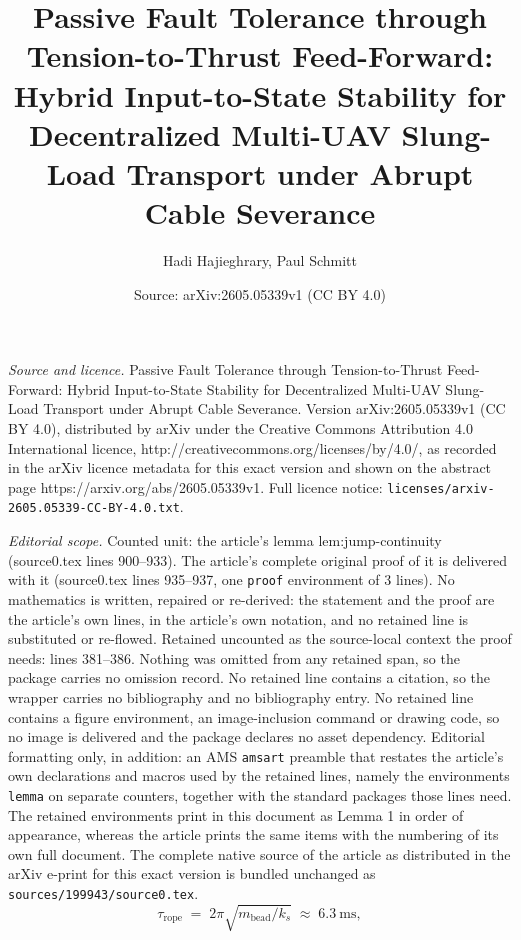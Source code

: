 \documentclass[10pt,a4paper]{amsart}
\title{Passive Fault Tolerance through Tension-to-Thrust Feed-Forward: Hybrid Input-to-State Stability for Decentralized Multi-UAV Slung-Load Transport under Abrupt Cable Severance}
\author{Hadi Hajieghrary, Paul Schmitt}
\date{Source: arXiv:2605.05339v1 (CC BY 4.0)}
\begin{document}
\maketitle

\noindent\emph{Source and licence.} Passive Fault Tolerance through Tension-to-Thrust Feed-Forward: Hybrid Input-to-State Stability for Decentralized Multi-UAV Slung-Load Transport under Abrupt Cable Severance. Version arXiv:2605.05339v1 (CC BY 4.0), distributed by arXiv under the Creative Commons Attribution 4.0 International licence, http://creativecommons.org/licenses/by/4.0/, as recorded in the arXiv licence metadata for this exact version and shown on the abstract page https://arxiv.org/abs/2605.05339v1. Full licence notice: \texttt{licenses/arxiv-2605.05339-CC-BY-4.0.txt}.\par\smallskip

\noindent\textit{Editorial scope.} Counted unit: the article's lemma lem:jump-continuity (source0.tex lines 900--933). The article's complete original proof of it is delivered with it (source0.tex lines 935--937, one \texttt{proof} environment of 3 lines). No mathematics is written, repaired or re-derived: the statement and the proof are the article's own lines, in the article's own notation, and no retained line is substituted or re-flowed.  Retained uncounted as the source-local context the proof needs: lines 381--386.  Nothing was omitted from any retained span, so the package carries no omission record.  No retained line contains a citation, so the wrapper carries no bibliography and no bibliography entry.  No retained line contains a figure environment, an image-inclusion command or drawing code, so no image is delivered and the package declares no asset dependency.  Editorial formatting only, in addition: an AMS \texttt{amsart} preamble that restates the article's own declarations and macros used by the retained lines, namely the environments \texttt{lemma} on separate counters, together with the standard packages those lines need.  The retained environments print in this document as Lemma 1 in order of appearance, whereas the article prints the same items with the numbering of its own full document.  The complete native source of the article as distributed in the arXiv e-print for this exact version is bundled unchanged as \texttt{sources/199943/source0.tex}.
\begin{equation}
  \tau_{\mathrm{rope}}
    \;=\; 2\pi\sqrt{m_{\mathrm{bead}}/k_s}
    \;\approx\; \SI{6.3}{\milli\second},
  \label{eq:tau-rope}
\end{equation}
\end{document}
